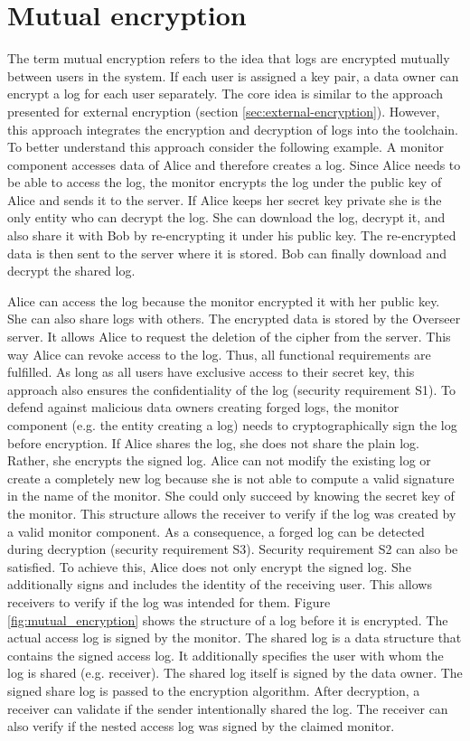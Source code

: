 \documentclass[../main.tex]{subfiles}
\begin{document}
\section{Mutual encryption}
\label{sec:mutual-encryption}
The term mutual encryption refers to the idea that logs are encrypted mutually between users in the system.
If each user is assigned a key pair, a data owner can encrypt a log for each user separately.
The core idea is similar to the approach presented for external encryption (section \ref{sec:external-encryption}).
However, this approach integrates the encryption and decryption of logs into the toolchain.
To better understand this approach consider the following example.
A monitor component accesses data of Alice and therefore creates a log.
Since Alice needs to be able to access the log, the monitor encrypts the log under the public key of Alice and sends it to the server.
If Alice keeps her secret key private she is the only entity who can decrypt the log.
She can download the log, decrypt it, and also share it with Bob by re-encrypting it under his public key.
The re-encrypted data is then sent to the server where it is stored.
Bob can finally download and decrypt the shared log.

Alice can access the log because the monitor encrypted it with her public key.
She can also share logs with others.
The encrypted data is stored by the Overseer server.
It allows Alice to request the deletion of the cipher from the server.
This way Alice can revoke access to the log.
Thus, all functional requirements are fulfilled.
As long as all users have exclusive access to their secret key, this approach also ensures the confidentiality of the log (security requirement S1).
To defend against malicious data owners creating forged logs, the monitor component (e.g. the entity creating a log) needs to cryptographically sign the log before encryption.
If Alice shares the log, she does not share the plain log.
Rather, she encrypts the signed log.
Alice can not modify the existing log or create a completely new log because she is not able to compute a valid signature in the name of the monitor.
She could only succeed by knowing the secret key of the monitor.
This structure allows the receiver to verify if the log was created by a valid monitor component.
As a consequence, a forged log can be detected during decryption (security requirement S3).
Security requirement S2 can also be satisfied.
To achieve this, Alice does not only encrypt the signed log.
She additionally signs and includes the identity of the receiving user.
This allows receivers to verify if the log was intended for them.
Figure \ref{fig:mutual_encryption} shows the structure of a log before it is encrypted.
The actual access log is signed by the monitor.
The shared log is a data structure that contains the signed access log.
It additionally specifies the user with whom the log is shared (e.g. receiver).
The shared log itself is signed by the data owner.
The signed share log is passed to the encryption algorithm.
After decryption, a receiver can validate if the sender intentionally shared the log.
The receiver can also verify if the nested access log was signed by the claimed monitor.
\end{document}
